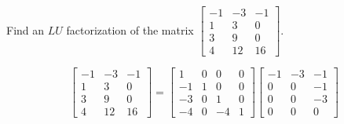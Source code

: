 \documentclass{ximera}
\begin{document}
\begin{problem}\label{prb:4.69} Find an $LU$ factorization of the matrix $\left[
\begin{array}{rrr}
-1 & -3 & -1 \\
1 & 3 & 0 \\
3 & 9 & 0 \\
4 & 12 & 16
\end{array}
\right] .$
\begin{hint}
\[
\left[
\begin{array}{rrr}
-1 & -3 & -1 \\
1 & 3 & 0 \\
3 & 9 & 0 \\
4 & 12 & 16
\end{array}
\right] = \left[
\begin{array}{rrrr}
1 & 0 & 0 & 0 \\
-1 & 1 & 0 & 0 \\
-3 & 0 & 1 & 0 \\
-4 & 0 & -4 & 1
\end{array}
\right] \left[
\begin{array}{rrr}
-1 & -3 & -1 \\
0 & 0 & -1 \\
0 & 0 & -3 \\
0 & 0 & 0
\end{array}
\right]
\]
\end{hint}
\end{problem}
\end{document}
